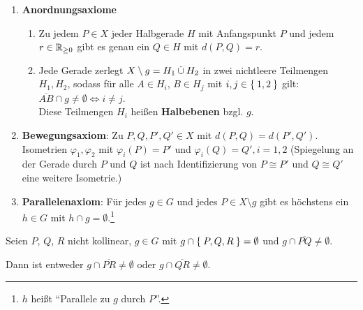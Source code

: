 \begin{definition}
    \begin{enumerate}[label=§\arabic*),ref=§\arabic*,start=3]
        \item \textbf{Anordnungsaxiome}\label{axiom:3}
            \begin{enumerate}[label=(\roman*),ref=§\theenumi{} (\roman*)]
                \item \label{axiom:3.1} Zu jedem $P \in X$ jeder 
                      Halbgerade $H$ mit Anfangspunkt $P$ und jedem 
                      $r \in \mathbb{R}_{\geq 0}$ gibt es genau ein 
                      $Q \in H$ mit $d(P,Q) = r$.
                \item \label{axiom:3.2} Jede Gerade zerlegt 
                      $X \setminus g = H_1 \mathbin{\dot{\cup}} H_2$ in zwei 
                      nichtleere Teilmengen $H_1, H_2$,
                      sodass für alle $A \in H_i$, $B \in H_j$ mit
                      $i,j \in \Set{1,2}$ gilt: 
                      $\overline{AB} \cap g \neq \emptyset \Leftrightarrow i \neq j$.\\
                      Diese Teilmengen $H_i$ heißen 
                      \textbf{Halbebenen} bzgl. 
                      $g$.
            \end{enumerate}
        \item \textbf{Bewegungsaxiom}: Zu $P, Q, P', Q' \in X$\label{axiom:4}
            mit $d(P,Q) = d(P', Q')$. Isometrien $\varphi_1, \varphi_2$
            mit $\varphi_i (P) = P'$ und $\varphi_i(Q) = Q', i=1,2$
            (Spiegelung an der Gerade durch $P$ und $Q$ ist nach 
             Identifizierung von $P \cong P'$ und $Q \cong Q'$ eine
             weitere Isometrie.)
        \item \textbf{Parallelenaxiom}: Für jedes $g \in G$ und jedes
            $P \in X \setminus g$ gibt es höchstens ein $h \in G$ mit
            $h \cap g = \emptyset$.\footnote{$h$ heißt \enquote{Parallele zu $g$ durch $P$}.}
    \end{enumerate}
\end{definition}

\begin{satz}\label{satz:pasch} %
    Seien $P$, $Q$, $R$ nicht kollinear, $g \in G$ mit $g \cap \Set{P, Q, R} = \emptyset$
    und $g \cap \overline{PQ} \neq \emptyset$. 

    Dann ist entweder $g \cap \overline{PR} \neq \emptyset$ oder 
                      $g \cap \overline{QR} \neq \emptyset$.
\end{satz}

